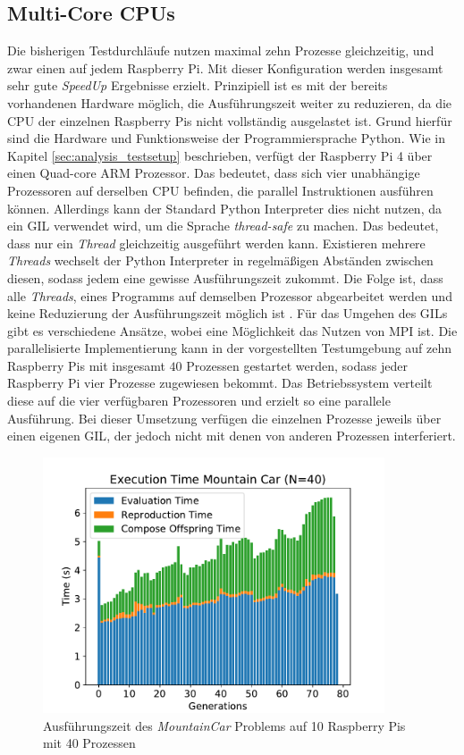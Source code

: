 \subsection{Multi-Core CPUs}
Die bisherigen Testdurchläufe nutzen maximal zehn Prozesse gleichzeitig, und zwar einen auf jedem Raspberry Pi. Mit dieser Konfiguration werden insgesamt sehr gute \emph{SpeedUp} Ergebnisse erzielt. Prinzipiell ist es mit der bereits vorhandenen Hardware möglich, die Ausführungszeit weiter zu reduzieren, da die \ac{CPU} der einzelnen Raspberry Pis nicht vollständig ausgelastet ist. Grund hierfür sind die Hardware und Funktionsweise der Programmiersprache Python. Wie in Kapitel \ref{sec:analysis_testsetup} beschrieben, verfügt der Raspberry Pi 4 über einen Quad-core ARM Prozessor. Das bedeutet, dass sich vier unabhängige Prozessoren auf derselben \ac{CPU} befinden, die parallel Instruktionen ausführen können. Allerdings kann der Standard Python Interpreter dies nicht nutzen, da ein \ac{GIL} verwendet wird, um die Sprache \emph{thread-safe} zu machen. Das bedeutet, dass nur ein \emph{Thread} gleichzeitig ausgeführt werden kann. Existieren mehrere \emph{Threads} wechselt der Python Interpreter in regelmäßigen Abständen zwischen diesen, sodass jedem eine gewisse Ausführungszeit zukommt. Die Folge ist, dass alle \emph{Threads}, eines Programms auf demselben Prozessor abgearbeitet werden und keine Reduzierung der Ausführungszeit möglich ist \cite{marowka2018python}. Für das Umgehen des \acp{GIL} gibt es verschiedene Ansätze, wobei eine Möglichkeit das Nutzen von \ac{MPI} ist. Die parallelisierte Implementierung kann in der vorgestellten Testumgebung auf zehn Raspberry Pis mit insgesamt $40$ Prozessen gestartet werden, sodass jeder Raspberry Pi vier Prozesse zugewiesen bekommt. Das Betriebssystem verteilt diese auf die vier verfügbaren Prozessoren und erzielt so eine parallele Ausführung. Bei dieser Umsetzung verfügen die einzelnen Prozesse jeweils über einen eigenen \ac{GIL}, der jedoch nicht mit denen von anderen Prozessen interferiert.
\begin{figure}[!h]
	\centering
	\includegraphics[width=0.9\textwidth]{./img/mountain_car_analysis/1413_time_40core_10pi.pdf} 
	\caption{Ausführungszeit des \emph{MountainCar} Problems auf 10 Raspberry Pis mit 40 Prozessen}
	\label{fig:mountain_car_time_40core_10pi}
\end{figure}
